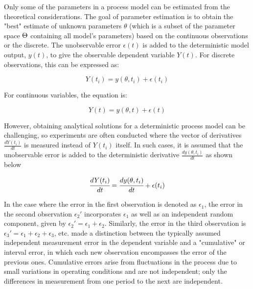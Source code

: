 \documentclass[../Article_Model_Parameters.tex]{subfiles}
\begin{document}
	Only some of the parameters in a process model can be estimated from the theoretical considerations. The goal of parameter estimation is to obtain the "best" estimate of unknown parameters $\theta$ (which is a subset of the parameter space ${\color{black}\Theta}$ containing all model's parameters) based on the continuous observations or the discrete. The unobservable error $\epsilon(t)$ is added to the deterministic model output, $y(t)$, to give the observable dependent variable $Y(t)$. For discrete observations, this can be expressed as:
	
	{\footnotesize
		\begin{equation*}
			Y(t_i) = y(\theta, t_i) + \epsilon(t_i)
	\end{equation*} }
	
	For continuous variables, the equation is:
	
	{\footnotesize
		\begin{equation*}
			Y(t) = y(\theta, t) + \epsilon(t)
	\end{equation*} }
	
	However, obtaining analytical solutions for a deterministic process model can be challenging, so experiments are often conducted where the vector of derivatives $\frac{dY(t_i)}{dt}$ is measured instead of $Y(t_i)$ itself. In such cases, it is assumed that the unobservable error is added to the deterministic derivative $\frac{dy(\theta, t_i)}{dt}$ as shown below
	
	{\footnotesize
		\begin{equation}  \label{EQ: Measurment_noise}
			\cfrac{d Y(t_i)}{dt} = \cfrac{dy(\theta, t_i)}{dt} + \epsilon(t_i)
	\end{equation} }
	
	In the case where the error in the first observation is denoted as $\epsilon_1$, the error in the second observation $\epsilon_2'$ incorporates $\epsilon_1$ as well as an independent random component, given by $\epsilon_2' = \epsilon_1 + \epsilon_2$. Similarly, the error in the third observation is $\epsilon_3' = \epsilon_1 + \epsilon_2 + \epsilon_3$, etc. \citet{Mandel1957}  made a distinction between the typically assumed independent measurement error in the dependent variable and a "cumulative" or interval error, in which each new observation encompasses the error of the previous ones. Cumulative errors arise from fluctuations in the process due to small variations in operating conditions and are not independent; only the differences in measurement from one period to the next are independent.
	
\end{document}
